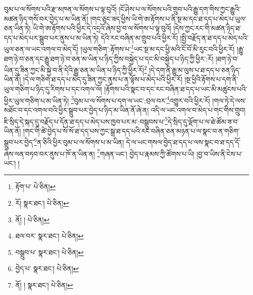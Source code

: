 བུམ་པ་ལ་སོགས་པའི་རྫ་མཁན་ལ་སོགས་པ་ལྟ་བུའོ། །ངོ་ཤེས་པ་ལ་སོགས་པའི་གྲུབ་པའི་རྒྱུ་དག་གིས་ཀྱང་རྒྱུའི་མཚན་ཉིད་གསོ་བར་བྱེད་པ་མ་ཡིན་ནོ། །གང་ཅུང་ཟད་ཕྱིས་ཡི་གེ་ཨ་རྟོགས་པ་ནི་སྔ་མ་དང་ཐ་དད་པ་མེད་པ་ཡུལ་ཅན་ཡིན་ཏེ། ཡི་གེ་ཨ་རྟོགས་པའི་ཕྱིར་དེ་འདྲའོ་ཞེས་བྱ་བ་ལ་སོགས་པ་ལྟ་བུའོ། །དེས་ཀྱང་རང་གི་མཚན་ཉིད་ཐ་དད་པ་མེད་པར་སྒྲུབ་པར་ནུས་པ་མ་ཡིན་ཏེ། དེའི་རང་བཞིན་མ་གྲུབ་པའི་ཕྱིར་རོ། །སྤྱི་བརྗོད་ན་ཐ་དད་པ་མེད་པའི་ཡུལ་ཅན་ལ་ཡང་འགལ་བ་མེད་དོ། །ཡུལ་གཅིག་:རྟོགས་པ་\footnote{རྟོག་པ་  པེ་ཅིན། }ཡང་སྔ་མ་དང་ཕྱི་མའི་ངོ་བོ་མི་རུང་བའི་ཕྱིར་རོ། །རྒྱུ་ཐག་ཉེ་བ་ཅན་དང་རྒྱུ་ཐག་ཉེ་བ་ཅན་མ་ཡིན་པ་ཉིད་ཀྱིས་བསྐྱེད་པ་དང་མི་བསྐྱེད་པ་ཉིད་ཀྱི་ཕྱིར་:རོ། །ཐག་ཉེ་བ་ཡིན་དུ་ཟིན་ཀྱང་མི་སྐྱེ་བ་ནི་དེའི་རྒྱུ་ཅན་མ་ཡིན་པ་ཉིད་ཀྱི་ཕྱིར་རོ།\footnote{རོ།  སྣར་ཐང་།  པེ་ཅིན། } །དེ་དག་ནི་རྒྱུ་མ་ལུས་པ་ཐ་དད་པ་ཅན་ཉིད་ཡིན་ནོ། །དེ་ལ་གཅིག་ཐ་དད་པ་མེད་དུ་ཟིན་ཀྱང་ནུས་པ་ན་ལྟོས་པ་མེད་པའི་ཕྱིར་རོ། །སྔ་ཕྱིའི་རྟོགས་པ་དག་ནི་ཡུལ་གཅིག་པ་ཉིད་དུ་རིགས་པ་དང་འགལ་ལོ། །རྟོགས་པའི་སྣང་བ་དང་རང་བཞིན་ཐ་དད་པ་ཡང་མི་མཚུངས་པའི་ཕྱིར་ཡུལ་གཅིག་པ་མ་ཡིན་ཏེ། \footnote{ནོ། །   པེ་ཅིན། }བུམ་པ་ལ་སོགས་པ་དག་ལ་ཡང་:བྲལ་བར་\footnote{ཐལ་བར་  སྣར་ཐང་།  པེ་ཅིན། }འགྱུར་བའི་ཕྱིར་རོ། །གལ་ཏེ་དེ་ལས་མཐོང་བ་དང་འགལ་བའི་ཕྱིར་སྒྲུབ་པར་བྱེད་པ་ཉིད་མ་ཡིན་ནོ་ཞེ་ན། འདི་ལ་ཡང་འགལ་བ་མེད་པ་གང་གིས་གྲུབ། ཇི་སྲིད་དེ་སྐད་དུ་བརྗོད་པ་དོན་ཐ་དད་པ་མེད་པས་ཁྱབ་པར་མ་:བསྒྲུབས་པ་\footnote{བསྒྲུབ་པ་  སྣར་ཐང་།  པེ་ཅིན། }དེ་སྲིད་དུ་ལྡོག་པ་ལ་ཐེ་ཚོམ་ཟ་བ་ཡིན་ནོ། །གང་གི་ཚེ་བྱེད་པ་སོ་སོ་ཐ་དད་པས་ཀྱང་སྒྲ་ཐ་དད་པའི་རང་བཞིན་ཅན་མཉན་པ་ལ་སྣང་བ་ན་གཅིག་སྒྲུབ་པར་བྱེད་\footnote{བྱེད་པ་  སྣར་ཐང་།  པེ་ཅིན། }ན་ཅིའི་ཕྱིར་བུམ་པ་ལ་སོགས་པ་མ་ཡིན། དེ་ལ་ཡང་གསལ་བྱེད་ཐ་དད་པ་ལས་སྣང་བ་ཐ་དད་དོ་ཞེས་ལན་བཏབ་བར་ནུས་པ་ཁོ་ན་ཡིན་ན། \footnote{ནོ། །   སྣར་ཐང་།  པེ་ཅིན། }གཞན་ཡང་། བྱེད་པ་རྣམས་ཀྱི་ཚོགས་པ་ཡི། །བྱ་བ་ཡིས་ནི་ངེས་པ་ཡང་། །
